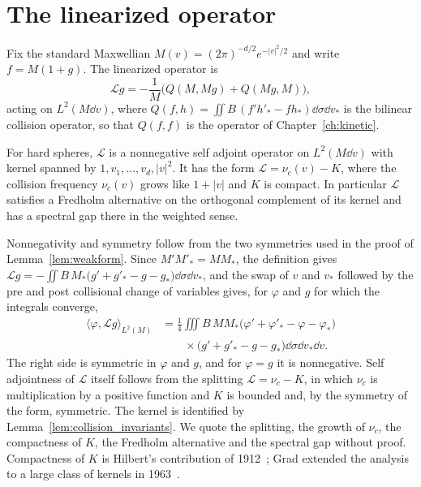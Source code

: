 \section{The linearized operator}

Fix the standard Maxwellian $M(v) = (2\pi)^{-d/2}e^{-|v|^2/2}$ and write $f = M(1+g)$. The linearized operator is
\[
\mathcal{L}g = -\frac1M\big(Q(M,Mg)+Q(Mg,M)\big),
\]
acting on $L^2(M\dd v)$, where $Q(f,h) = \iint B\,(f'h'_*-fh_*)\dd\sigma\dd v_*$ is the bilinear collision operator, so that $Q(f,f)$ is the operator of Chapter~\ref{ch:kinetic}.

\begin{theorem}
\label{thm:linearized}
For hard spheres, $\mathcal{L}$ is a nonnegative self adjoint operator on $L^2(M\dd v)$ with kernel spanned by $1,v_1,\dots,v_d,|v|^2$. It has the form $\mathcal{L} = \nu_c(v)-K$, where the collision frequency $\nu_c(v)$ grows like $1+|v|$ and $K$ is compact. In particular $\mathcal{L}$ satisfies a Fredholm alternative on the orthogonal complement of its kernel and has a spectral gap there in the weighted sense.
\end{theorem}

Nonnegativity and symmetry follow from the two symmetries used in the proof of Lemma~\ref{lem:weakform}. Since $M'M'_* = MM_*$, the definition gives $\mathcal{L}g = -\iint B\,M_*\big(g'+g'_*-g-g_*\big)\dd\sigma\dd v_*$, and the swap of $v$ and $v_*$ followed by the pre and post collisional change of variables gives, for $\varphi$ and $g$ for which the integrals converge,
\[
\begin{aligned}\langle\varphi,\mathcal{L}g\rangle_{L^2(M)} &= \frac14\iiint B\,MM_*\big(\varphi'+\varphi'_*-\varphi-\varphi_*\big)\\ &\qquad\times\big(g'+g'_*-g-g_*\big)\dd\sigma\dd v_*\dd v.\end{aligned}
\]
The right side is symmetric in $\varphi$ and $g$, and for $\varphi = g$ it is nonnegative. Self adjointness of $\mathcal{L}$ itself follows from the splitting $\mathcal{L} = \nu_c-K$, in which $\nu_c$ is multiplication by a positive function and $K$ is bounded and, by the symmetry of the form, symmetric. The kernel is identified by Lemma~\ref{lem:collision_invariants}. We quote the splitting, the growth of $\nu_c$, the compactness of $K$, the Fredholm alternative and the spectral gap without proof. Compactness of $K$ is Hilbert's contribution of 1912~\cite{hilbert1912}; Grad extended the analysis to a large class of kernels in 1963~\cite{grad1963}.

